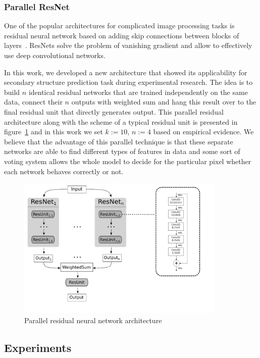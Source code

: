 \documentclass[runningheads]{llncs}
\begin{document}
\subsubsection{Parallel ResNet}
One of the popular architectures for complicated image processing tasks is residual neural network based on adding skip connections between blocks of layers~\cite{he2016deep}. ResNets solve the problem of vanishing gradient and allow to effectively use deep convolutional networks.

In this work, we developed a new architecture that showed its applicability for secondary structure prediction task during experimental research. The idea is to build $n$ identical residual networks that are trained independently on the same data, connect their $n$ outputs with weighted sum and hang this result over to the final residual unit that directly generates output. This parallel residual architecture along with the scheme of a typical residual unit is presented in figure~\ref{nn} and in this work we set $k := 10$, $n := 4$ based on empirical evidence. We believe that the advantage of this parallel technique is that these separate networks are able to find different types of features in data and some sort of voting system allows the whole model to decide for the particular pixel whether each network behaves correctly or not.

\begin{figure}[h]
\begin{center}
\centering
\includegraphics[width=10cm]{pics/nn.pdf}
\caption{Parallel residual neural network architecture}
\label{nn}
\end{center}
\end{figure} 

\subsection{Experiments}


%
 

\end{document}
